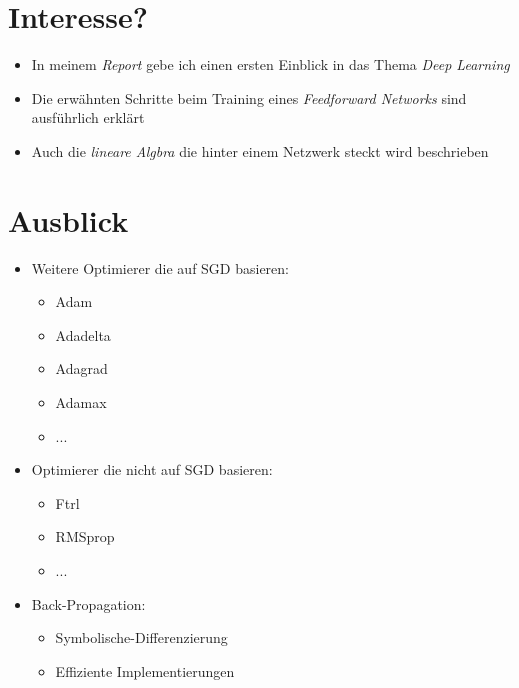 \documentclass[t]{beamer}
\begin{document}
\section{Interesse?}
\begin{frame}
    \begin{itemize}
        \item In meinem \emph{Report} gebe ich einen ersten Einblick in das Thema \emph{Deep Learning} \newline
        \item Die erwähnten Schritte beim Training eines \emph{Feedforward Networks} sind ausführlich erklärt \newline
        \item Auch die \emph{lineare Algbra} die hinter einem Netzwerk steckt wird beschrieben
    \end{itemize}
\end{frame}

\section{Ausblick}
\begin{frame}
    \begin{itemize}
        \item Weitere Optimierer die auf SGD basieren:
        \begin{itemize}
            \item Adam
            \item Adadelta
            \item Adagrad
            \item Adamax
            \item ... \newline
        \end{itemize}
        \item Optimierer die nicht auf SGD basieren:
        \begin{itemize}
            \item Ftrl
            \item RMSprop
            \item ... \newline
        \end{itemize}
        \item Back-Propagation:
        \begin{itemize}
            \item Symbolische-Differenzierung
            \item Effiziente Implementierungen
        \end{itemize}
    \end{itemize}
\end{frame}
\end{document}
